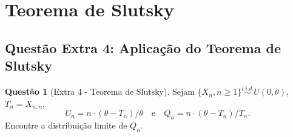 \documentclass[12pt,a4paper]{article}
\theoremstyle{definition}
\newtheorem{questao}{Questão}[section]
\theoremstyle{remark}
\begin{document}
\section{Teorema de Slutsky}

\subsection{Questão Extra 4: Aplicação do Teorema de Slutsky}

\begin{questao}[Extra 4 - Teorema de Slutsky]
Sejam $\{X_n, n \geq 1\} \overset{i.i.d.}{\sim} U(0, \theta)$, $T_n = X_{n:n}$, 
\[
U_n = n \cdot (\theta - T_n)/\theta \quad \text{e} \quad Q_n = n \cdot (\theta - T_n)/T_n.
\]
Encontre a distribuição limite de $Q_n$.
\end{questao}
\end{document}
